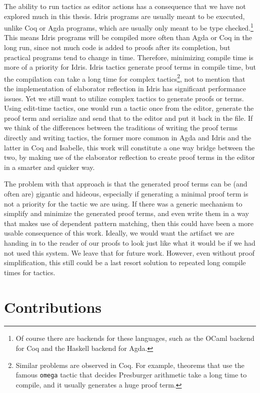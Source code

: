 The ability to run tactics as editor actions has a consequence
that we have not explored much in this thesis.
Idris programs are usually meant to be executed, unlike Coq or
Agda programs, which are usually only meant to be type checked.\footnote{Of
  course there are backends for these languages, such as the OCaml
  backend for Coq and the Haskell backend for Agda.}
This means Idris programs will be compiled more often than Agda or Coq in the long run,
since not much code is added to proofs after its completion, but practical programs tend to change in time. Therefore, minimizing compile time is more of a priority for Idris.
Idris tactics generate proof terms in compile time, but the
compilation can take a long time for complex tactics\footnote{Similar problems
are observed in Coq. For example, theorems that use the famous \texttt{omega}
tactic that decides Presburger arithmetic take a long time to compile, and it
usually generates a huge proof term.},
not to mention that the implementation of elaborator
reflection in Idris has significant performance issues.\cite{leanmeta}
Yet we still want to utilize complex tactics to generate proofs or terms.
Using edit-time tactics, one would run a tactic once from the editor, generate
the proof term and serialize and send that to the editor and put it back in the
file.
If we think of the differences between the traditions of writing the proof
terms directly and writing tactics, the former more common in Agda and Idris
and the latter in Coq and Isabelle, this work will constitute a one way bridge
between the two, by making use of the elaborator reflection to create proof
terms in the editor in a smarter and quicker way.

The problem with that approach is that the generated proof terms can be (and
often are) gigantic and hideous, especially if generating a minimal proof term
is not a priority for the tactic we are using.
If there was a generic mechanism to simplify and minimize the generated proof
terms, and even write them in a way that makes use of dependent pattern
matching, then this could have been a more usable consequence of this work.
Ideally, we would want the artifact we are handing in to the reader of our
proofs to look just like what it would be if we had not used this system.
We leave that for future work.  However, even without proof simplification,
this still could be a last resort solution to repeated long compile times for
tactics.

\section{Contributions}

